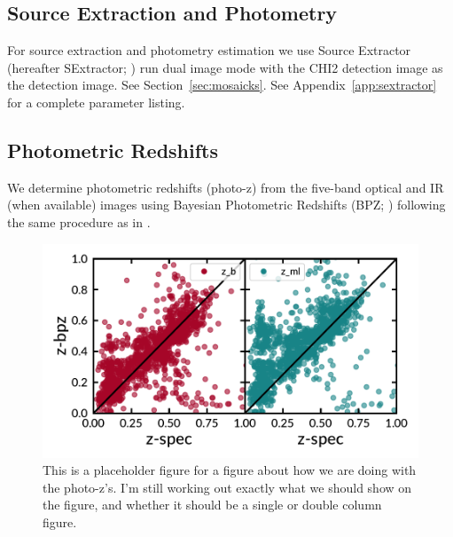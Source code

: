 \documentclass[apj, revtex4]{emulateapj}
\begin{document}
\subsection{Source Extraction and Photometry}
For source extraction and photometry estimation we use Source Extractor (hereafter SExtractor; \citealt{Bertin1996}) run dual image mode with the CHI2 detection image as the detection image. See Section~\ref{sec:mosaicks}. See Appendix~\ref{app:sextractor} for a complete parameter listing.

\subsection{Photometric Redshifts}
We determine photometric redshifts (photo-z) from the five-band optical and IR (when available) images using Bayesian Photometric Redshifts (BPZ; \citealt{Benitez2000, Coe2006}) following the same procedure as in \cite{Menanteau2009a}.

\begin{figure} 
	\includegraphics[width=\textwidth]{figures/specVSphot.pdf} 
	\caption{This is a placeholder figure for a figure about how we are doing with the photo-z's. I'm still working out exactly what we should show on the figure, and whether it should be a single or double column figure.} 
	\label{fig:icd_vs_mass} 
\end{figure}
\end{document}
